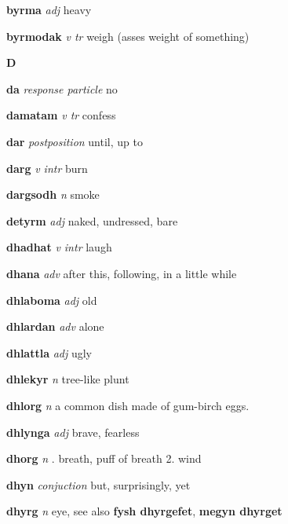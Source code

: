 \textbf{byrma}   \emph{adj} \textperiodcentered heavy

\textbf{byrmodak}   \emph{v tr} \textperiodcentered weigh (asses weight of something)

\begin{center} \Huge \bfseries D \end{center}\textbf{da}   \emph{response particle} \textperiodcentered no

\textbf{damatam}   \emph{v tr} \textperiodcentered confess

\textbf{dar}   \emph{postposition} \textperiodcentered until, up to

\textbf{darg}   \emph{v intr} \textperiodcentered burn

\textbf{dargsodh}   \emph{n} \textperiodcentered smoke

\textbf{detyrm}   \emph{adj} \textperiodcentered naked, undressed, bare

\textbf{dhadhat}   \emph{v intr} \textperiodcentered laugh

\textbf{dhana}   \emph{adv} \textperiodcentered after this, following, in a little while

\textbf{dhlaboma}   \emph{adj} \textperiodcentered old

\textbf{dhlardan}   \emph{adv} \textperiodcentered alone

\textbf{dhlattla}   \emph{adj} \textperiodcentered ugly

\textbf{dhlekyr}   \emph{n} \textperiodcentered tree-like plunt

\textbf{dhlorg}   \emph{n} \textperiodcentered a common dish made of gum-birch eggs.

\textbf{dhlynga}   \emph{adj} \textperiodcentered brave, fearless

\textbf{dhorg}   \emph{n} . breath, puff of breath 2. wind 

\textbf{dhyn}   \emph{conjuction} \textperiodcentered but, surprisingly, yet

\textbf{dhyrg}   \emph{n} \textperiodcentered eye, see also \textbf{fysh dhyrgefet}, \textbf{megyn dhyrget}

